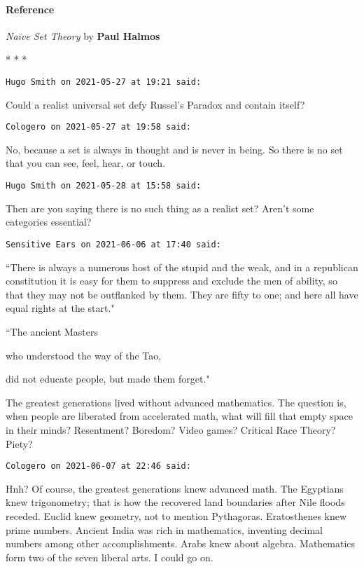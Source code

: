 \paragraph{Reference}
\emph{Naïve Set Theory} by \textbf{Paul Halmos}


\begin{center}* * *\end{center}

\begin{footnotesize}\begin{sffamily}



\texttt{Hugo Smith on 2021-05-27 at 19:21 said: }

Could a realist universal set defy Russel's Paradox and contain itself?


\hfill

\texttt{Cologero on 2021-05-27 at 19:58 said: }

No, because a set is always in thought and is never in being. So there is no set that you can see, feel, hear, or touch.


\hfill

\texttt{Hugo Smith on 2021-05-28 at 15:58 said: }

Then are you saying there is no such thing as a realist set? Aren't some categories essential?


\hfill

\texttt{Sensitive Ears on 2021-06-06 at 17:40 said: }

``There is always a numerous host of the stupid and the weak, and in a republican constitution it is easy for them to suppress and exclude the men of ability, so that they may not be outflanked by them. They are fifty to one; and here all have equal rights at the start."

``The ancient Masters

who understood the way of the Tao,

did not educate people, but made them forget."

The greatest generations lived without advanced mathematics. The question is, when people are liberated from accelerated math, what will fill that empty space in their minds? Resentment? Boredom? Video games? Critical Race Theory? Piety?


\hfill

\texttt{Cologero on 2021-06-07 at 22:46 said: }

Hnh? Of course, the greatest generations knew advanced math. The Egyptians knew trigonometry; that is how the recovered land boundaries after Nile floods receded. Euclid knew geometry, not to mention Pythagoras. Eratosthenes knew prime numbers. Ancient India was rich in mathematics, inventing decimal numbers among other accomplishments. Arabs knew about algebra. Mathematics form two of the seven liberal arts. I could go on.


\end{sffamily}
\end{footnotesize}
